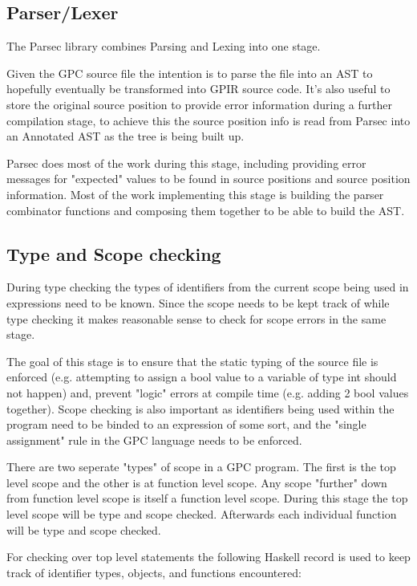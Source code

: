     
\subsection{Parser/Lexer}
The Parsec library combines Parsing and Lexing into one stage.

Given the GPC source file the intention is to parse the file into an AST
to hopefully eventually be transformed into GPIR source code. It's
also useful to store the original source position to provide error information 
during a further compilation stage, to achieve this the source position
info is read from Parsec into an Annotated AST as the tree is being built up.

Parsec does most of the work during this stage, including
providing error messages for "expected" values to be found in source
positions and source position information. Most of the work implementing
this stage is building the parser combinator functions and composing
them together to be able to build the AST.


\subsection{Type and Scope checking}

During type checking the types of identifiers from the current scope being used in expressions need
to be known. Since the scope needs to be kept track of while type checking it makes reasonable
sense to check for scope errors in the same stage.

The goal of this stage is to ensure that the static typing of the source file
is enforced (e.g. attempting to assign a bool value to a variable of type int should not happen) and,
prevent "logic" errors at compile time (e.g. adding 2 bool values together). Scope checking
is also important as identifiers being used within the program need to be binded to an expression of
some sort, and the "single assignment" rule in the GPC language needs to be enforced.

There are two seperate "types" of scope in a GPC program. The first is the top level scope and the
other is at function level scope. Any scope "further" down from function level scope is itself
a function level scope. During this stage the top level scope will be type and scope checked.
Afterwards each individual function will be type and scope checked.

For checking over top level statements the following Haskell record is used
to keep track of identifier types, objects, and functions encountered:

